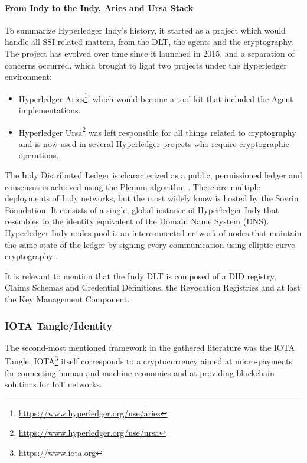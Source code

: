 \paragraph{From Indy to the Indy, Aries and Ursa Stack}

To summarize Hyperledger Indy's history, it started as a project which would handle all SSI related matters, from the DLT, the agents and the cryptography. The project has evolved over time since it launched in 2015, and a separation of concerns occurred, which brought to light two projects under the Hyperledger environment:

\begin{itemize}
    \item Hyperledger Aries\footnote{\url{https://www.hyperledger.org/use/aries}}, which would become a tool kit that included the Agent implementations.
    \item Hyperledger Ursa\footnote{\url{https://www.hyperledger.org/use/ursa}} was left responsible for all things related to cryptography and is now used in several Hyperledger projects who require cryptographic operations.
\end{itemize}

The Indy Distributed Ledger is characterized as a public, permissioned ledger and consensus is achieved using the Plenum algorithm \cite{terzi2020securing}. There are multiple deployments of Indy networks, but the most widely know is hosted by the Sovrin Foundation. It consists of a single, global instance of Hyperledger Indy that resembles to the identity equivalent of the Domain Name System (DNS). Hyperledger Indy nodes pool is an interconnected network of nodes that maintain the same state of the ledger by signing every communication using elliptic curve cryptography \cite{SovrinIotSSI}.

It is relevant to mention that the Indy DLT is composed of a DID registry, Claims Schemas and Credential Definitions, the Revocation Registries and at last the Key Management Component.

\subsubsection{IOTA Tangle/Identity}

The second-most mentioned framework in the gathered literature was the IOTA Tangle. IOTA\footnote{\url{https://www.iota.org}} itself corresponds to a cryptocurrency aimed at micro-payments for connecting human and machine economies and at providing blockchain solutions for IoT networks.

